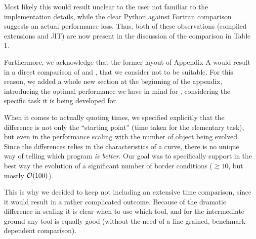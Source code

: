 \documentclass[a4paper,11pt]{article}
\begin{document}
\begin{response}
Most likely this would result unclear to the user not familiar to the
implementation details, while the clear Python against Fortran comparison
suggests an actual performance loss.
Thus, both of these observations (compiled extensions and JIT) are now present
in the discussion of the comparison in Table 1.

Furthermore, we acknowledge that the former layout of Appendix A would result
in a direct comparison of \eko{} and \apfel{}, that we consider not to be
suitable.
For this reason, we added a whole new section at the beginning of the appendix,
introducing the optimal performance we have in mind for \eko{}, considering the
specific task it is being developed for.

When it comes to actually quoting times, we specified explicitly that the
difference is not only the \enquote{starting point} (time taken for the
elementary task), but even in the performance scaling with the number of object
being evolved.
Since the differences relies in the characteristics of a curve, there is no
unique way of telling which program \textit{is better}. Our goal was to
specifically support in the best way the evolution of a significant number of
border conditions ($\gtrsim 10$, but mostly $\order{100}$).

This is why we decided to keep not including an extensive time comparison,
since it would result in a rather complicated outcome.
Because of the dramatic difference in scaling it is clear when to use which
tool, and for the intermediate ground any tool is equally good (without the
need of a fine grained, benchmark dependent comparison).

\end{response}
\end{document}
